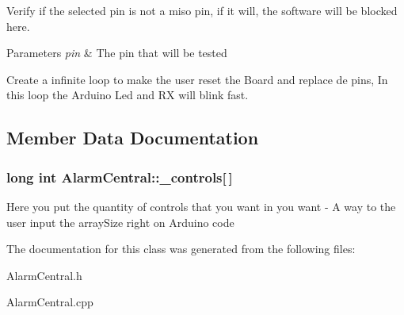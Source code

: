 Verify if the selected pin is not a miso pin, if it will, the software will be blocked here. 
\begin{DoxyParams}{Parameters}
{\em pin} & The pin that will be tested \\
\hline
\end{DoxyParams}
Create a infinite loop to make the user reset the Board and replace de pins, In this loop the Arduino Led and R\+X will blink fast.

\subsection{Member Data Documentation}
\hypertarget{classAlarmCentral_aec9cd3106b6f29a18825deea32f62f04}{
\subsubsection[{\+\_\+controls}]{\setlength{\rightskip}{0pt plus 5cm}long int Alarm\+Central\+::\+\_\+controls\mbox{[}$\,$\mbox{]}\hspace{0.3cm}{\ttfamily [private]}}}\label{classAlarmCentral_aec9cd3106b6f29a18825deea32f62f04}
Here you put the quantity of controls that you want in you want  -\/ A way to the user input the array\+Size right on Arduino code 

The documentation for this class was generated from the following files\+:\begin{DoxyCompactItemize}
\item 
Alarm\+Central.\+h\item 
Alarm\+Central.\+cpp\end{DoxyCompactItemize}

